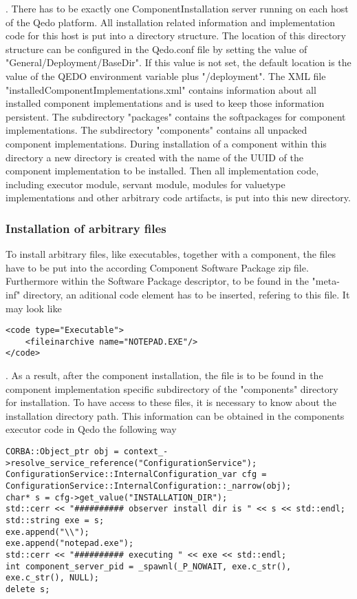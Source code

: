 \documentclass[12pt,a4paper]{report}
\begin{document}
. There has to be exactly one ComponentInstallation server running on each host of the Qedo platform. All installation related information and implementation code for this host is put into a directory structure. The location of this directory structure can be configured in the Qedo.conf file by setting the value of "General/Deployment/BaseDir". If this value is not set, the default location is the value of the QEDO environment variable plus "/deployment". The XML file "installedComponentImplementations.xml" contains information about all installed component implementations and is used to keep those information persistent. The subdirectory "packages" contains the softpackages for component implementations. The subdirectory "components" contains all unpacked component implementations. During installation of a component within this directory a new directory is created with the name of the UUID of the component implementation to be installed. Then all implementation code, including executor module, servant module, modules for valuetype implementations and other arbitrary code artifacts, is put into this new directory.

\subsubsection{Installation of arbitrary files}
\label{sec:Installation of arbitrary code}

To install arbitrary files, like executables, together with a component, the files have to be put into the according Component Software Package zip file. Furthermore within the Software Package descriptor, to be found in the "meta-inf" directory, an aditional code element has to be inserted, refering to this file. It may look like
\begin{verbatim}
<code type="Executable">
    <fileinarchive name="NOTEPAD.EXE"/>
</code>
\end{verbatim}

. As a result, after the component installation, the file is to be found in the component implementation specific subdirectory of the "components" directory for installation. To have access to these files, it is necessary to know about the installation directory path. This information can be obtained in the components executor code in Qedo the following way

\begin{verbatim}
CORBA::Object_ptr obj = context_->resolve_service_reference("ConfigurationService");
ConfigurationService::InternalConfiguration_var cfg = ConfigurationService::InternalConfiguration::_narrow(obj);
char* s = cfg->get_value("INSTALLATION_DIR");
std::cerr << "########## observer install dir is " << s << std::endl;
std::string exe = s;
exe.append("\\");
exe.append("notepad.exe");
std::cerr << "########## executing " << exe << std::endl;
int component_server_pid = _spawnl(_P_NOWAIT, exe.c_str(), exe.c_str(), NULL);
delete s;
\end{verbatim}
\end{document}
